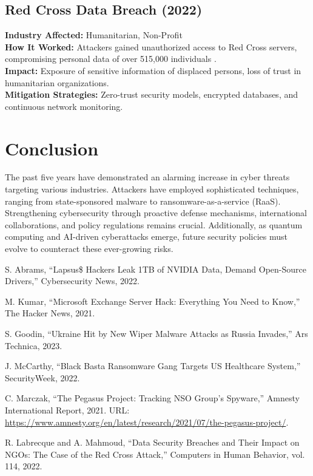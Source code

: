 \documentclass[a4paper,12pt]{article}
\begin{document}
\subsection{Red Cross Data Breach (2022)}
\textbf{Industry Affected:} Humanitarian, Non-Profit \\
\textbf{How It Worked:} Attackers gained unauthorized access to Red Cross servers, compromising personal data of over 515,000 individuals \cite{redcross2022}.\\
\textbf{Impact:} Exposure of sensitive information of displaced persons, loss of trust in humanitarian organizations.\\
\textbf{Mitigation Strategies:} Zero-trust security models, encrypted databases, and continuous network monitoring.

\section{Conclusion}
The past five years have demonstrated an alarming increase in cyber threats targeting various industries. Attackers have employed sophisticated techniques, ranging from state-sponsored malware to ransomware-as-a-service (RaaS). Strengthening cybersecurity through proactive defense mechanisms, international collaborations, and policy regulations remains crucial. Additionally, as quantum computing and AI-driven cyberattacks emerge, future security policies must evolve to counteract these ever-growing risks.

\begin{thebibliography}{9}
 S. Abrams, ``Lapsus\$ Hackers Leak 1TB of NVIDIA Data, Demand Open-Source Drivers,'' Cybersecurity News, 2022.

 M. Kumar, ``Microsoft Exchange Server Hack: Everything You Need to Know,'' The Hacker News, 2021. 

 S. Goodin, ``Ukraine Hit by New Wiper Malware Attacks as Russia Invades,'' Ars Technica, 2023.

 J. McCarthy, ``Black Basta Ransomware Gang Targets US Healthcare System,'' SecurityWeek, 2022.

 C. Marczak, ``The Pegasus Project: Tracking NSO Group’s Spyware,'' Amnesty International Report, 2021. URL: \url{https://www.amnesty.org/en/latest/research/2021/07/the-pegasus-project/}.

 R. Labrecque and A. Mahmoud, ``Data Security Breaches and Their Impact on NGOs: The Case of the Red Cross Attack,'' Computers in Human Behavior, vol. 114, 2022.
\end{thebibliography}
\end{document}
